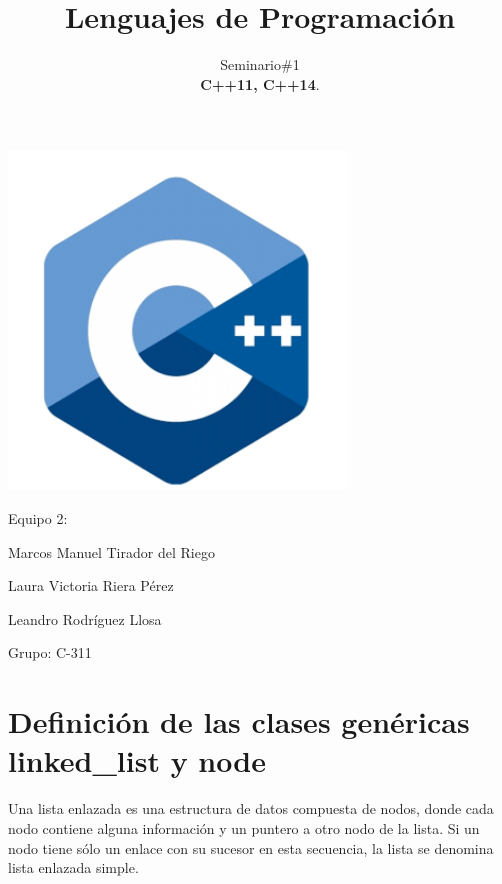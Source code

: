 \documentclass[10pt]{article}
\title{\textbf{Lenguajes de Programaci\'on}}
\author{Seminario\#1\\
 \textbf{C++11, C++14}.}
\date{}
\begin{document}
	\begin{titlepage}
		\clearpage	
		\maketitle
		\begin{center}
			\includegraphics[width=9cm]{c++logo.png}
			
			\vspace{5em}
			Equipo 2:
			
			Marcos Manuel Tirador del Riego
			
			Laura Victoria Riera P\'erez
			
			Leandro Rodr\'iguez Llosa
			\vspace{1em}
			
			Grupo: C-311
		\end{center}
		\thispagestyle{empty}
	\end{titlepage}


\newpage
{}
\tableofcontents
\thispagestyle{empty}

\newpage
{}
\section{Definici\'on de las clases genéricas linked\_list y node}



Una lista enlazada es una estructura de datos compuesta de nodos, donde cada nodo contiene alguna información y un puntero a otro nodo de la lista. Si un nodo tiene sólo un enlace con su sucesor en esta secuencia, la lista se denomina lista enlazada simple.
\end{document}
